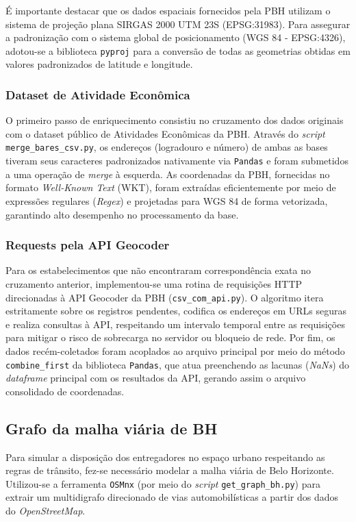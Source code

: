 \documentclass[12pt,a4paper]{article}
\begin{document}
É importante destacar que os dados espaciais fornecidos pela PBH utilizam o sistema de projeção plana SIRGAS 2000 UTM 23S (EPSG:31983). Para assegurar a padronização com o sistema global de posicionamento (WGS 84 - EPSG:4326), adotou-se a biblioteca \texttt{pyproj} para a conversão de todas as geometrias obtidas em valores padronizados de latitude e longitude.

\subsubsection{Dataset de Atividade Econômica}
O primeiro passo de enriquecimento consistiu no cruzamento dos dados originais com o dataset público de Atividades Econômicas da PBH. Através do \textit{script} \texttt{merge\_bares\_csv.py}, os endereços (logradouro e número) de ambas as bases tiveram seus caracteres padronizados nativamente via \texttt{Pandas} e foram submetidos a uma operação de \textit{merge} à esquerda. As coordenadas da PBH, fornecidas no formato \textit{Well-Known Text} (WKT), foram extraídas eficientemente por meio de expressões regulares (\textit{Regex}) e projetadas para WGS 84 de forma vetorizada, garantindo alto desempenho no processamento da base.

\subsubsection{Requests pela API Geocoder}
Para os estabelecimentos que não encontraram correspondência exata no cruzamento anterior, implementou-se uma rotina de requisições HTTP direcionadas à API Geocoder da PBH (\texttt{csv\_com\_api.py}). O algoritmo itera estritamente sobre os registros pendentes, codifica os endereços em URLs seguras e realiza consultas à API, respeitando um intervalo temporal entre as requisições para mitigar o risco de sobrecarga no servidor ou bloqueio de rede. Por fim, os dados recém-coletados foram acoplados ao arquivo principal por meio do método \texttt{combine\_first} da biblioteca \texttt{Pandas}, que atua preenchendo as lacunas (\textit{NaNs}) do \textit{dataframe} principal com os resultados da API, gerando assim o arquivo consolidado de coordenadas.

\subsection{Grafo da malha viária de BH}
Para simular a disposição dos entregadores no espaço urbano respeitando as regras de trânsito, fez-se necessário modelar a malha viária de Belo Horizonte. Utilizou-se a ferramenta \texttt{OSMnx} (por meio do \textit{script} \texttt{get\_graph\_bh.py}) para extrair um multidigrafo direcionado de vias automobilísticas a partir dos dados do \textit{OpenStreetMap}. 
\end{document}
